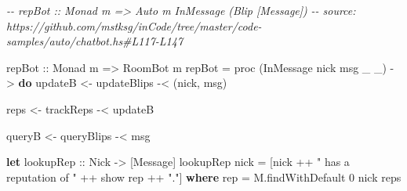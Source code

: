 \documentclass[]{article}
\newenvironment{Shaded}{}{}
\newcommand{\CommentTok}[1]{\textcolor[rgb]{0.38,0.63,0.69}{\textit{#1}}}
\newcommand{\DataTypeTok}[1]{\textcolor[rgb]{0.56,0.13,0.00}{#1}}
\newcommand{\DecValTok}[1]{\textcolor[rgb]{0.25,0.63,0.44}{#1}}
\newcommand{\FunctionTok}[1]{\textcolor[rgb]{0.02,0.16,0.49}{#1}}
\newcommand{\KeywordTok}[1]{\textcolor[rgb]{0.00,0.44,0.13}{\textbf{#1}}}
\newcommand{\NormalTok}[1]{#1}
\newcommand{\OperatorTok}[1]{\textcolor[rgb]{0.40,0.40,0.40}{#1}}
\newcommand{\OtherTok}[1]{\textcolor[rgb]{0.00,0.44,0.13}{#1}}
\newcommand{\StringTok}[1]{\textcolor[rgb]{0.25,0.44,0.63}{#1}}
\begin{document}
\begin{Shaded}
\begin{Highlighting}[]
\CommentTok{{-}{-} repBot :: Monad m =\textgreater{} Auto m InMessage (Blip [Message])}
\CommentTok{{-}{-} source: https://github.com/mstksg/inCode/tree/master/code{-}samples/auto/chatbot.hs\#L117{-}L147}

\OtherTok{repBot ::} \DataTypeTok{Monad}\NormalTok{ m }\OtherTok{=\textgreater{}} \DataTypeTok{RoomBot}\NormalTok{ m}
\NormalTok{repBot }\OtherTok{=}\NormalTok{ proc (}\DataTypeTok{InMessage}\NormalTok{ nick msg \_ \_) }\OtherTok{{-}\textgreater{}} \KeywordTok{do}
\NormalTok{    updateB }\OtherTok{\textless{}{-}}\NormalTok{ updateBlips }\OperatorTok{{-}\textless{}}\NormalTok{ (nick, msg)}

\NormalTok{    reps    }\OtherTok{\textless{}{-}}\NormalTok{ trackReps   }\OperatorTok{{-}\textless{}}\NormalTok{ updateB}

\NormalTok{    queryB  }\OtherTok{\textless{}{-}}\NormalTok{ queryBlips  }\OperatorTok{{-}\textless{}}\NormalTok{ msg}

    \KeywordTok{let}\OtherTok{ lookupRep ::} \DataTypeTok{Nick} \OtherTok{{-}\textgreater{}}\NormalTok{ [}\DataTypeTok{Message}\NormalTok{]}
\NormalTok{        lookupRep nick }\OtherTok{=}\NormalTok{ [nick }\OperatorTok{++} \StringTok{" has a reputation of "} \OperatorTok{++} \FunctionTok{show}\NormalTok{ rep }\OperatorTok{++} \StringTok{"."}\NormalTok{]}
          \KeywordTok{where}
\NormalTok{            rep }\OtherTok{=}\NormalTok{ M.findWithDefault }\DecValTok{0}\NormalTok{ nick reps}


\end{Highlighting}
\end{Shaded}
\end{document}
